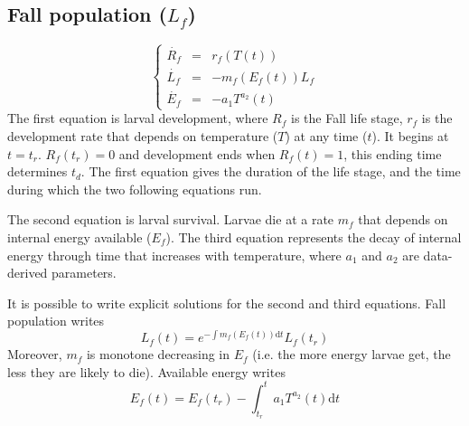 \documentclass[12 pt]{article}
\begin{document}
\subsection{Fall population ($L_f$)}
\begin{equation}
    \left \lbrace
    \begin{array}{lcl}
        \Dot{R_f} & = & r_f(T(t)) \\
        \Dot{L_f} & = & - m_f(E_f (t))L_f \\
        \Dot{E_f} & = & -a_1 T ^{a_2} (t)
    \end{array} \right .
\end{equation}
The first equation is larval development, where $R_f$ is the Fall life stage, $r_f$ is the development rate that depends on temperature ($T$) at any time ($t$). It begins at $t=t_r$. $R_f(t_r)=0$ and development ends when $R_f(t)=1$, this ending time determines $t_d$. The first equation gives the duration of the life stage, and the time during which the two following equations run.\par
The second equation is larval survival. Larvae die at a rate $m_f$ that depends on internal energy available ($E_f$). The third equation represents the decay of internal energy through time that increases with temperature, where $a_1$ and $a_2$ are data-derived parameters.\par
It is possible to write explicit solutions for the second and third equations. Fall population writes
\begin{equation}
    L_f(t)=e ^{-\int m_f(E_f (t)) \mathrm{d}t} L_f (t_r)
\end{equation}
Moreover, $m_f$ is monotone decreasing in $E_f$ (i.e. the more energy larvae get, the less they are likely to die). Available energy writes
\begin{equation}
    E_f (t) = E_f(t_r) - \int _{t_r}^{t} a_1 T ^{a_2}(t) \mathrm{d}t
\end{equation}
\end{document}
